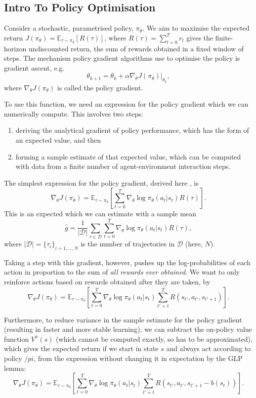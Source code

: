 \documentclass{article}
\begin{document}
\subsection{Intro To Policy Optimisation}

Consider a stochastic, parametrised policy, $\pi_\theta$. We aim to maximise the expected return $J(\pi_\theta) = \mathbb{E}_{\tau \sim \pi_\theta} \left[ R(\tau) \right]$, where $R(\tau) = \sum_{t=0}^Tr_t$ gives the finite-horizon undiscounted return, the sum of rewards obtained in a fixed window of steps. The mechanism policy gradient algorithms use to optimise the policy is gradient ascent, e.g. $$\theta_{k+1} = \theta_k + \alpha \nabla_\theta J(\pi_\theta) |_{\theta_k},$$ where $\nabla_\theta J(\pi_\theta)$ is called the policy gradient.

To use this function, we need an expression for the policy gradient which we can numerically compute. This involves two steps:
\begin{enumerate}
  \item deriving the analytical gradient of policy performance, which has the form of an expected value, and then
  \item forming a sample estimate of that expected value, which can be computed with data from a finite number of agent-environment interaction steps.
\end{enumerate}

The simplest expression for the policy gradient, derived here \cite{}, is $$\nabla_\theta J(\pi_\theta) = \mathbb{E}_{\tau \sim \pi_\theta} \left[ \sum_{t=0}^T \nabla_\theta \log \pi_\theta(a_t | s_t) R(\tau) \right].$$ This is an expected which we can estimate with a sample mean $$\hat{g} = \frac{1}{\lvert \mathcal{D} \rvert} \sum_{\tau \in \mathcal{D}} \sum_{t=0}^T \nabla_\theta \log \pi_\theta(a_t | s_t) R(\tau),$$ where $\lvert \mathcal{D} \rvert = \{ \tau_i \}_{i=1, \dots, N}$ is the number of trajectories in $\mathcal{D}$ (here, $N$).

Taking a step with this gradient, however, pushes up the log-probabilities of each action in proportion to the sum of \textit{all rewards ever obtained}. We want to only reinforce actions based on rewards obtained after they are taken, by $$\nabla_\theta J(\pi_\theta) = \mathbb{E}_{\tau \sim \pi_\theta} \left[ \sum_{t=0}^T \nabla_\theta \log \pi_\theta(a_t | s_t) \sum_{t'=t}^T R(s_{t'}, a_{t'}, s_{t'+1}) \right].$$

Furthermore, to reduce variance in the sample estimate for the policy gradient (resulting in faster and more stable learning), we can subtract the on-policy value function $V^\pi(s)$ (which cannot be computed exactly, so has to be approximated), which gives the expected return if we start in state $s$ and always act according to policy $/pi$, from the expression without changing it in expectation by the GLP lemma: $$\nabla_\theta J(\pi_\theta) = \mathbb{E}_{\tau \sim \pi_\theta} \left[ \sum_{t=0}^T \nabla_\theta \log \pi_\theta(a_t | s_t) \sum_{t'=t}^T R \left( s_{t'}, a_{t'}, s_{t'+1} - b(s_t)\right) \right].$$ 
\end{document}
